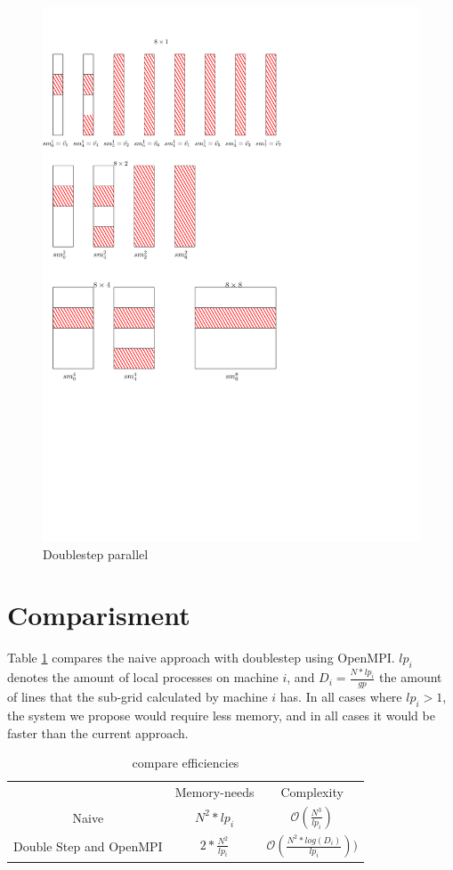 \documentclass[12pt]{article}
\begin{document}
\begin{figure}
\includegraphics[scale=0.7]{Doublestep_perpendicular}
\caption{Doublestep parallel}
\label{fig:DSperpendicular}
\end{figure}

\section{ Comparisment }

Table \ref{table:comp} compares the naive approach with doublestep using OpenMPI. $lp_i$ denotes the amount of local processes on machine $i$, and $D_i=\frac{N*lp_i}{gp}$ the amount of lines that the sub-grid calculated by machine $i$ has. In all cases where $lp_i>1$, the system we propose would require less memory, and in all cases it would be faster than the current approach.

\begin{table}
\label{table:comp}
\begin{tabular}{ |c|c|c| }
 \hline
  & Memory-needs & Complexity \\ 
 Naive & $N^2*lp_i$ & $\mathcal{O}(\frac{N^3}{lp_i})$ \\ 
 Double Step and OpenMPI &  $2*\frac{N^2}{lp_i}$ & $\mathcal{O}(\frac{N^2*log(D_i)}{lp_i}) )$\\ 
 \hline
\end{tabular}
\caption{compare efficiencies}
\end{table}
\end{document}
